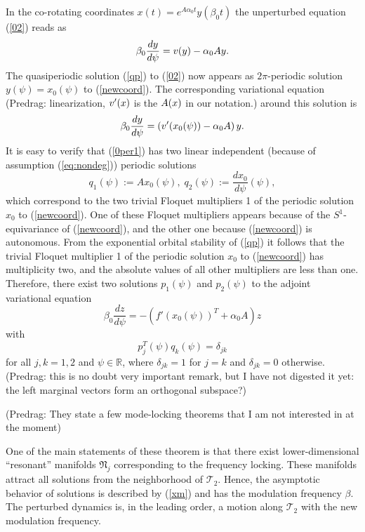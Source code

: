 \begin{description}
                                                                \toCB
In the co-rotating coordinates $x(t)=e^{A\alpha_{0}t}y(\beta_{0}t)$
the unperturbed equation (\ref{02}) reads as
\begin{equation}
\beta_{0}\frac{dy}{d\psi}=v(y)-\alpha_{0}Ay.
\label{newcoord}\end{equation}
The quasiperiodic solution (\ref{qp}) to (\ref{02}) now appears
as $2\pi$-periodic solution $y(\psi)=x_{0}(\psi)$ to (\ref{newcoord}).
The corresponding variational equation
(Predrag:
linearization, $v'(x)$ is the {\stabmat} $A(x)$ in our notation.)
around this solution is
\begin{equation}
\beta_{0}\frac{dy}{d\psi}=\left(v'(x_{0}(\psi))-\alpha_{0}A\right)y.
\label{0per1}\end{equation}
It is easy to verify
that (\ref{0per1}) has two linear independent (because of assumption
(\ref{eq:nondeg})) periodic solutions
                                                                \toCB
\begin{equation}
q_{1}(\psi):=Ax_{0}(\psi),\; q_{2}(\psi):=\frac{dx_{0}}{d\psi}(\psi),
\label{q}\end{equation}
 which correspond to the two trivial Floquet multipliers 1 of the
periodic solution $x_{0}$ to (\ref{newcoord}). One of these Floquet
multipliers appears because of the $S^{1}$-equivariance of (\ref{newcoord}),
and the other one because (\ref{newcoord}) is autonomous. From the
exponential orbital stability of (\ref{qp}) it follows that the trivial
Floquet multiplier 1 of the periodic solution $x_{0}$ to (\ref{newcoord})
has multiplicity two, and the absolute values of all other multipliers
are less than one. Therefore, there exist two solutions $p_{1}(\psi)$
and $p_{2}(\psi)$ to the adjoint variational equation
\begin{equation}
\beta_{0}\frac{dz}{d\psi}=-\left(f'(x_{0}(\psi))^{T}+\alpha_{0}A\right)z
\label{0per2}\end{equation}
 with \[
p_{j}^{T}(\psi)q_{k}(\psi)=\delta_{jk}\]
 for all $j,k=1,2$ and $\psi\in\mathbb{R}$, where $\delta_{jk}=1$
for $j=k$ and $\delta_{jk}=0$ otherwise.
(Predrag:
this is no doubt very important remark, but I have not digested it yet:
the left marginal vectors form an orthogonal subspace?)

(Predrag: They state a few mode-locking theorems that I am not interested
in at the moment)

One of the main statements of these theorem is that
there exist lower-dimensional {}``resonant'' manifolds $\mathfrak{N}_{j}$
corresponding to the frequency locking. These manifolds attract all
solutions from the neighborhood of $\mathcal{T}_{2}$. Hence, the
asymptotic behavior of solutions is described by (\ref{xm}) and has
the modulation frequency $\beta$.
The perturbed dynamics is, in the leading order, a motion along
$\mathcal{T}_{2}$ with the new modulation frequency.


\end{description}
